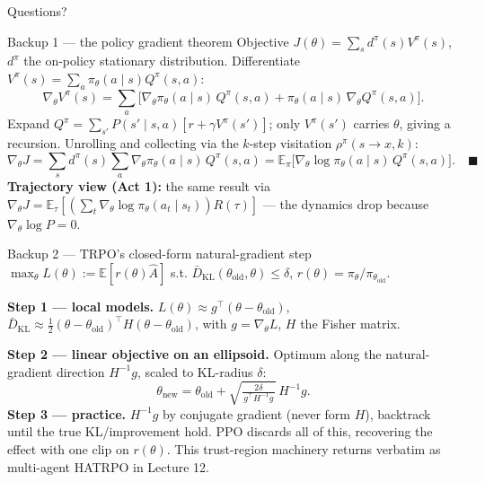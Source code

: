\documentclass[10pt, aspectratio=169]{beamer}
\begin{document}
\begin{frame}[standout]
Questions?
\end{frame}

\appendix

\begin{frame}{Backup 1 --- the policy gradient theorem}
\footnotesize
Objective $J(\theta)=\sum_s d^\pi(s)V^\pi(s)$, $d^\pi$ the on-policy stationary distribution. Differentiate $V^\pi(s)=\sum_a\pi_\theta(a\mid s)Q^\pi(s,a)$:
\[
\nabla_\theta V^\pi(s) = \sum_a \big[\nabla_\theta\pi_\theta(a\mid s)\,Q^\pi(s,a) + \pi_\theta(a\mid s)\,\nabla_\theta Q^\pi(s,a)\big].
\]
Expand $Q^\pi=\sum_{s'}P(s'\mid s,a)[r+\gamma V^\pi(s')]$; only $V^\pi(s')$ carries $\theta$, giving a recursion. Unrolling and collecting via the $k$-step visitation $\rho^\pi(s\to x,k)$:
\[
\nabla_\theta J = \sum_s d^\pi(s)\sum_a \nabla_\theta\pi_\theta(a\mid s)\,Q^\pi(s,a)
= \mathbb{E}_{\pi}\big[\nabla_\theta\log\pi_\theta(a\mid s)\,Q^\pi(s,a)\big]. \quad\blacksquare
\]
\textbf{Trajectory view (Act 1):} the same result via $\nabla_\theta J=\mathbb{E}_\tau[(\sum_t\nabla_\theta\log\pi_\theta(a_t\mid s_t))R(\tau)]$ --- the dynamics drop because $\nabla_\theta\log P=0$.
\end{frame}

\begin{frame}{Backup 2 --- TRPO's closed-form natural-gradient step}
\footnotesize
$\max_\theta L(\theta):=\mathbb{E}[r(\theta)\hat A]$ s.t. $\bar D_{\mathrm{KL}}(\theta_{\text{old}},\theta)\le\delta$, $r(\theta)=\pi_\theta/\pi_{\theta_{\text{old}}}$.
\medskip

\textbf{Step 1 --- local models.} $L(\theta)\approx g^\top(\theta-\theta_{\text{old}})$, $\bar D_{\mathrm{KL}}\approx\tfrac12(\theta-\theta_{\text{old}})^\top H(\theta-\theta_{\text{old}})$, with $g=\nabla_\theta L$, $H$ the Fisher matrix.
\medskip

\textbf{Step 2 --- linear objective on an ellipsoid.} Optimum along the natural-gradient direction $H^{-1}g$, scaled to KL-radius $\delta$:
\[
\theta_{\text{new}} = \theta_{\text{old}} + \sqrt{\tfrac{2\delta}{\,g^\top H^{-1}g\,}}\,H^{-1}g.
\]
\textbf{Step 3 --- practice.} $H^{-1}g$ by conjugate gradient (never form $H$), backtrack until the true KL/improvement hold. \alert{PPO} discards all of this, recovering the effect with one clip on $r(\theta)$. This trust-region machinery returns verbatim as multi-agent HATRPO in Lecture 12.
\end{frame}
\end{document}
